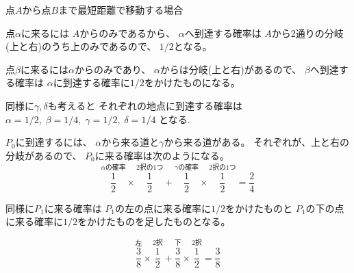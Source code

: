 \documentclass[12pt,b5paper]{ltjsarticle}
\begin{document}
\hrulefill




点$A$から点$B$まで最短距離で移動する場合


点$\alpha$に来るには
$A$からのみであるから、
$\alpha$へ到達する確率は
$A$から2通りの分岐(上と右)のうち上のみであるので、
$1/2$となる。

点$\beta$に来るには$\alpha$からのみであり、
$\alpha$からは分岐(上と右)があるので、
$\beta$へ到達する確率は
$\alpha$に到達する確率に$1/2$をかけたものになる。

同様に$\gamma,\delta$も考えると
それぞれの地点に到達する確率は
$\alpha=1/2,\;\beta=1/4,\;\gamma=1/2,\;\delta=1/4$
となる.

$P_{0}$に到達するには、
$\alpha$から来る道と$\gamma$から来る道がある。
それぞれが、上と右の分岐があるので、
$P_{0}$に来る確率は次のようになる。
\begin{equation}
 \overset{\alpha \text{の確率}}{\frac{1}{2}}\times \overset{\text{2択の1つ}}{\frac{1}{2}}
 +
 \overset{\gamma \text{の確率}}{\frac{1}{2}}\times \overset{\text{2択の1つ}}{\frac{1}{2}}
 = \frac{2}{4}
\end{equation}


同様に$P_{1}$に来る確率は
$P_{1}$の左の点に来る確率に$1/2$をかけたものと
$P_{1}$の下の点に来る確率に$1/2$をかけたものを足したものとなる。

\begin{equation}
 \overset{\text{左}}{\frac{3}{8}}\times \overset{\text{2択}}{\frac{1}{2}}
 +
 \overset{\text{下}}{\frac{3}{8}}\times \overset{\text{2択}}{\frac{1}{2}}
 = \frac{3}{8}
\end{equation}




\hrulefill
\end{document}
